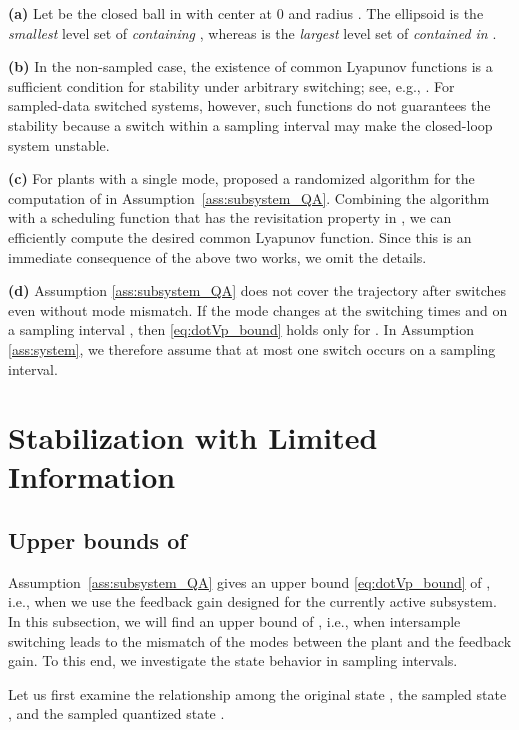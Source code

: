 \documentclass[a4, 11pt]{article}
\begin{document}
\begin{remark}
{\bf (a)}
Let  be
the closed ball in  with center at 0 and radius . 
The ellipsoid  is the \textit{smallest} level set of 
\textit{containing} , whereas  is
the \textit{largest} level set of  \textit{contained in} . 

\noindent
{\bf (b)}
In the non-sampled case,
the existence of common Lyapunov functions is a sufficient condition 
for stability under arbitrary switching; see, e.g., \cite{Liberzon2003Book, Lin2009}.
For sampled-data switched systems, however,
such functions do not guarantees the stability because
a switch within a sampling interval may make the closed-loop system unstable. 

\noindent
{\bf (c)}
For plants with a single mode,
\cite{Ishii2004}
proposed a randomized algorithm for the computation of  in 
Assumption~\ref{ass:subsystem_QA}.
Combining the algorithm with a scheduling function that has the 
revisitation property in \cite{Liberzon2004},
we can efficiently compute the desired common Lyapunov function.
Since this is an immediate consequence of the above two works,
we omit the details.

\noindent
{\bf (d)}
Assumption \ref{ass:subsystem_QA} does not cover
the trajectory after switches even without mode mismatch.
If the mode changes  
at the switching times  and  
on a sampling interval ,
then \eqref{eq:dotVp_bound} holds only for .
In Assumption \ref{ass:system}, we therefore assume that 
at most one switch occurs on
a sampling interval.
\end{remark}




\section{Stabilization with Limited Information}
\subsection{Upper bounds of }
Assumption~\ref{ass:subsystem_QA} gives an upper bound \eqref{eq:dotVp_bound}
of , i.e.,  when we use the feedback gain designed for
the currently active subsystem. 
In this subsection,
we will
find an upper bound of , i.e.,
 when intersample switching leads to the
mismatch of the modes between the plant and the feedback gain.
To this end, we investigate the state behavior in sampling intervals.


Let us first examine the relationship among 
the original state , the sampled state ,
and the sampled quantized state .
\end{document}
